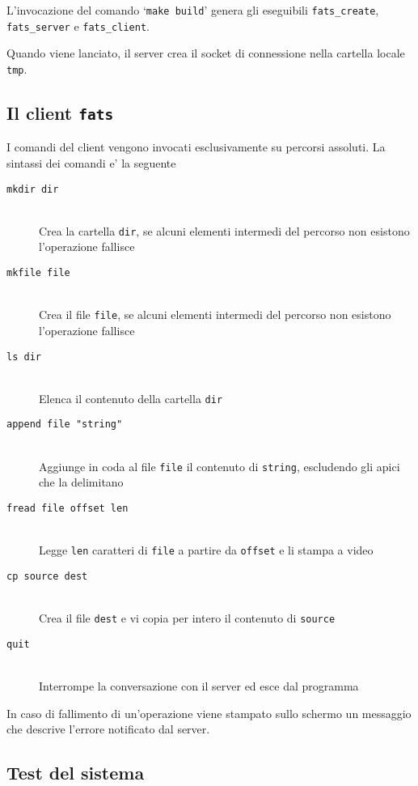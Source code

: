 \documentclass[11pt,oneside,a4paper]{article}
\begin{document}
L'invocazione del comando `\texttt{make build}' genera gli eseguibili \texttt{fats\_create}, \texttt{fats\_server} e \texttt{fats\_client}.

Quando viene lanciato, il server crea il socket di connessione nella cartella
locale \texttt{tmp}.

\subsection{Il client \texttt{fats}}

I comandi del client vengono invocati esclusivamente su percorsi assoluti. La
sintassi dei comandi e' la seguente
\begin{description}
  \item[\texttt{mkdir dir}] \hfill \\
    Crea la cartella \texttt{dir}, se alcuni elementi intermedi del percorso non esistono l'operazione fallisce
  \item[\texttt{mkfile file}] \hfill \\
    Crea il file \texttt{file}, se alcuni elementi intermedi del percorso non esistono l'operazione fallisce
  \item[\texttt{ls dir}] \hfill \\
    Elenca il contenuto della cartella \texttt{dir}
  \item[\texttt{append file "string"}] \hfill \\
    Aggiunge in coda al file \texttt{file} il contenuto di \texttt{string}, escludendo gli apici che la delimitano
  \item[\texttt{fread file offset len}] \hfill \\
    Legge \texttt{len} caratteri di \texttt{file} a partire da \texttt{offset} e li stampa a video
  \item[\texttt{cp source dest}] \hfill \\
    Crea il file \texttt{dest} e vi copia per intero il contenuto di \texttt{source}
  \item[\texttt{quit}] \hfill \\
    Interrompe la conversazione con il server ed esce dal programma
\end{description}
In caso di fallimento di un'operazione viene stampato sullo schermo un messaggio che descrive l'errore notificato dal server.

\subsection{Test del sistema}
\end{document}
